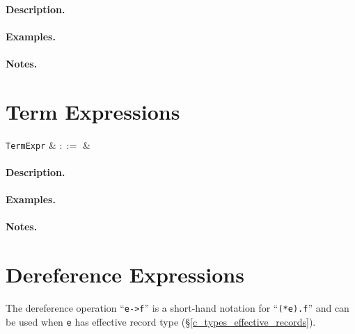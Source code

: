 \paragraph{Description.}

\paragraph{Examples.}

\paragraph{Notes.} 


\section{Term Expressions}
\label{c_expr_term}

\begin{syntax}
  \verb+TermExpr+ & $::=$ &\\
\end{syntax}

\paragraph{Description.}

\paragraph{Examples.}

\paragraph{Notes.} 


\section{Dereference Expressions}
\label{c_expr_dereference}


 The dereference operation ``\lstinline{e->f}'' is a short-hand notation for ``\lstinline{(*e).f}'' and can be used when \lstinline{e} has effective record type (\S\ref{c_types_effective_records}).


